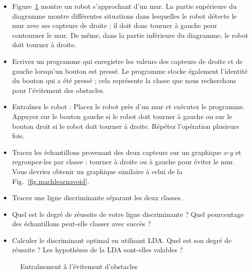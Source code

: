 \begin{framed}
\begin{itemize}
\item Figure~\ref{fig.train-data-avoid} montre un robot s'approchant d'un mur. La partie supérieure du diagramme montre différentes situations dans lesquelles le robot détecte le mur avec ses capteurs de droite ; il doit donc tourner à gauche pour contourner le mur. De même, dans la partie inférieure du diagramme, le robot doit tourner à droite.
\item Ecrivez un programme qui enregistre les valeurs des capteurs de droite et de gauche lorsqu'un bouton est pressé. Le programme stocke également l'identité du bouton qui a été pressé ; cela représente la classe que nous recherchons pour l'évitement des obstacles.
\item Entraînez le robot : Placez le robot près d'un mur et exécutez le programme. Appuyez sur le bouton gauche si le robot doit tourner à gauche ou sur le bouton droit si le robot doit tourner à droite. Répétez l'opération plusieurs fois.
\item Tracez les échantillons provenant des deux capteurs sur un graphique $x$-$y$ et regroupez-les par classe : tourner à droite ou à gauche pour éviter le mur. Vous devriez obtenir un graphique similaire à celui de la Fig.~\ref{fig.machlearnavoid}.
\item Tracez une ligne discriminante séparant les deux classes.
\item Quel est le degré de réussite de votre ligne discriminante ? Quel pourcentage des échantillons peut-elle classer avec succès ?
\item Calculer le discriminant optimal en utilisant LDA. Quel est son degré de réussite ? Les hypothèses de la LDA sont-elles valables ?
\end{itemize}
\end{framed}

\begin{figure}
\begin{center}
\end{center}
\caption{Entraînement à l'évitement d'obstacles}\label{fig.train-data-avoid}
\end{figure}

